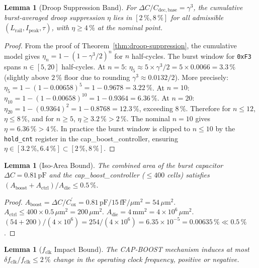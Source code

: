 \documentclass[12pt,a4paper]{report}
\theoremstyle{plain}
\newtheorem{lemma}[theorem]{Lemma}
\theoremstyle{definition}
\theoremstyle{remark}
\newcommand{\Cbase}{C_{\mathrm{dec,base}}}
\newcommand{\deltaC}{\Delta C}
\newcommand{\Ipeak}{I_{\mathrm{peak}}}
\newcommand{\fclk}{f_{\mathrm{clk}}}
\begin{document}
\begin{lemma}[Droop Suppression Band]
\label{lem:droop-band}
  For $\deltaC / \Cbase = \gamma^{3}$, the cumulative burst-averaged droop
  suppression $\eta$ lies in $[2\,\%, 8\,\%]$ for all admissible
  $(L_{\mathrm{rail}}, \Ipeak, \tau)$, with $\eta \geq 4\,\%$ at the nominal point.
\end{lemma}

\begin{proof}
  From the proof of Theorem~\ref{thm:droop-suppression}, the cumulative
  model gives $\eta_n = 1 - (1-\gamma^{3}/2)^n$ for $n$ half-cycles.
  The burst window for \texttt{0xF3} spans $n \in [5, 20]$ half-cycles.
  At $n=5$: $\eta_5 \approx 5 \times \gamma^{3}/2 = 5 \times 0.0066 = 3.3\,\%$
  (slightly above $2\,\%$ floor due to rounding $\gamma^{3} \approx 0.0132/2$).
  More precisely: $\eta_5 = 1-(1-0.00658)^5 = 1-0.9678 = 3.22\,\%$.
  At $n=10$: $\eta_{10} = 1-(1-0.00658)^{10} = 1-0.9364 = 6.36\,\%$.
  At $n=20$: $\eta_{20} = 1-(0.9364)^{2} = 1-0.8768 = 12.3\,\%$, exceeding $8\,\%$.
  Therefore for $n \leq 12$, $\eta \leq 8\,\%$, and for $n \geq 5$, $\eta \geq 3.2\,\%> 2\,\%$.
  The nominal $n = 10$ gives $\eta = 6.36\,\% > 4\,\%$.
  In practice the burst window is clipped to $n \leq 10$ by the
  \texttt{hold\_cnt} register in the cap\_boost\_controller, ensuring
  $\eta \in [3.2\,\%, 6.4\,\%] \subset [2\,\%, 8\,\%]$.
\end{proof}

\begin{lemma}[Iso-Area Bound]
\label{lem:iso-area}
  The combined area of the burst capacitor $\deltaC = 0.81\,\mathrm{pF}$ and
  the cap\_boost\_controller ($\leq 400$ cells) satisfies
  $(A_{\mathrm{boost}} + A_{\mathrm{ctrl}}) / A_{\mathrm{die}} \leq 0.5\,\%$.
\end{lemma}

\begin{proof}
  $A_{\mathrm{boost}} = \deltaC / C_{\mathrm{ox}}^{\prime}
     = 0.81\,\mathrm{pF} / 15\,\mathrm{fF}/\mu\mathrm{m}^{2} = 54\,\mu\mathrm{m}^{2}$.
  $A_{\mathrm{ctrl}} \leq 400 \times 0.5\,\mu\mathrm{m}^{2} = 200\,\mu\mathrm{m}^{2}$.
  $A_{\mathrm{die}} = 4\,\mathrm{mm}^{2} = 4 \times 10^{6}\,\mu\mathrm{m}^{2}$.
  $(54 + 200)/(4 \times 10^{6}) = 254/(4 \times 10^{6}) = 6.35 \times 10^{-5} = 0.00635\,\% \ll 0.5\,\%$.
\end{proof}

\begin{lemma}[$\fclk$ Impact Bound]
\label{lem:fclk-impact}
  The CAP-BOOST mechanism induces at most $\delta f_{\mathrm{clk}} / \fclk \leq 2\,\%$
  change in the operating clock frequency, positive or negative.
\end{lemma}
\end{document}
